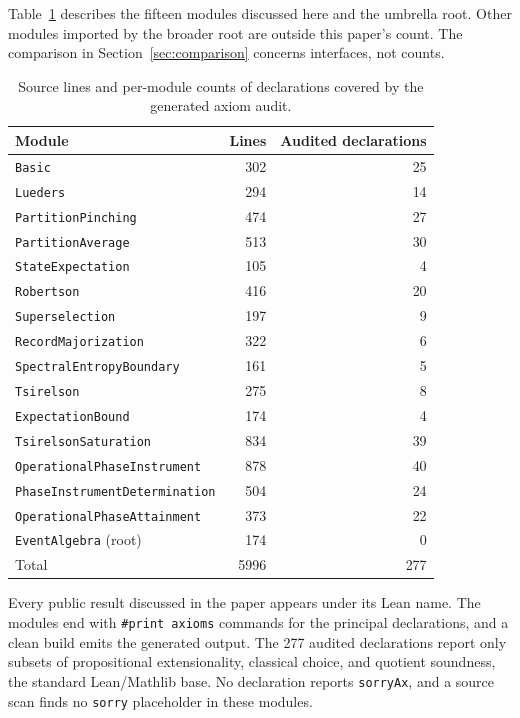 \documentclass[11pt]{article}
\renewcommand{\_}{\textunderscore\allowbreak}
\theoremstyle{remark}
\begin{document}
Table~\ref{tab:scale} describes the fifteen modules discussed here and the
umbrella root. Other modules imported by the broader root are outside this
paper's count. The comparison in Section~\ref{sec:comparison} concerns
interfaces, not counts.

\begin{table}[ht]
\centering
\small
\begin{tabular}{@{}lrr@{}}
\toprule
Module & Lines & Audited declarations \\
\midrule
\texttt{Basic} & 302 & 25 \\
\texttt{Lueders} & 294 & 14 \\
\texttt{PartitionPinching} & 474 & 27 \\
\texttt{PartitionAverage} & 513 & 30 \\
\texttt{StateExpectation} & 105 & 4 \\
\texttt{Robertson} & 416 & 20 \\
\texttt{Superselection} & 197 & 9 \\
\texttt{RecordMajorization} & 322 & 6 \\
\texttt{SpectralEntropyBoundary} & 161 & 5 \\
\texttt{Tsirelson} & 275 & 8 \\
\texttt{ExpectationBound} & 174 & 4 \\
\texttt{TsirelsonSaturation} & 834 & 39 \\
\texttt{OperationalPhaseInstrument} & 878 & 40 \\
\texttt{PhaseInstrumentDetermination} & 504 & 24 \\
\texttt{OperationalPhaseAttainment} & 373 & 22 \\
\texttt{EventAlgebra} (root) & 174 & 0 \\
\midrule
Total & 5996 & 277 \\
\bottomrule
\end{tabular}
\caption{Source lines and per-module counts of declarations covered by the
generated axiom audit.}
\label{tab:scale}
\end{table}

Every public result discussed in the paper appears under its Lean name. The
modules end with \texttt{\#print axioms} commands for the principal
declarations, and a clean build emits the generated output. The 277 audited
declarations report only subsets of propositional extensionality, classical
choice, and quotient soundness, the standard Lean/Mathlib base. No declaration
reports \texttt{sorryAx}, and a source scan finds no \texttt{sorry}
placeholder in these modules.
\end{document}

